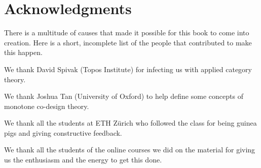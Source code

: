 
\section{Acknowledgments}

There is a multitude of causes that made it possible for this book to come into creation.
Here is a short, incomplete list of the people that contributed to make this happen.

We thank David Spivak (Topos Institute) for infecting us with applied category theory.

We thank Joshua Tan (University of Oxford) to help define some concepts of monotone co-design theory.

We thank all the students at ETH Zürich who followed the class for being guinea pigs and giving constructive feedback.

We thank all the students of the online courses we did on the material for giving us the enthusiasm and the energy to get this done.


\begin{comment}
An incomplete list of students to thank for their feedback: Linus Schoch, Marius Furter, Yujun Huang, Erol Gromig, Simon Sieroka, James Sch\"ar, Victor Kawasaki-Borruat, Han-Miru Kim, Justin Bollhalder, Luca Giudici

\end{comment}
